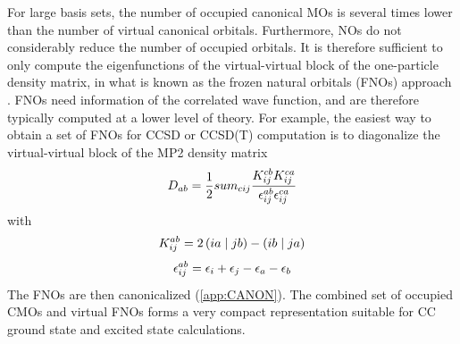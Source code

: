For large basis sets, the number of occupied canonical MOs is several times lower than the number of virtual canonical orbitals. Furthermore, NOs do not considerably reduce the number of occupied orbitals. It is therefore sufficient to only compute the eigenfunctions of the virtual-virtual block of the one-particle density matrix, in what is known as the frozen natural orbitals (FNOs) approach \cite{Bar1970}. FNOs need information of the correlated wave function, and are therefore typically computed at a lower level of theory. For example, the easiest way to obtain a set of FNOs for CCSD or CCSD(T) computation is to diagonalize the virtual-virtual block  of the MP2 density matrix \cite{Sos1989, Tau2005, Tau2008}
\begin{equation}
D_{ab} = \frac{1}{2} sum_{cij} \frac{K_{ij}^{cb} K_{ij}^{ca}}{\epsilon_{ij}^{ab} \epsilon_{ij}^{ca}}
\end{equation}
\noindent with
\begin{equation}
K_{ij}^{ab} = 2 \left( ia \mid jb \right) - \left( ib \mid ja \right)
\end{equation}
\begin{equation}
\epsilon_{ij}^{ab} = \epsilon_i + \epsilon_j - \epsilon_a - \epsilon_b 
\end{equation}
The FNOs are then canonicalized (\ref{app:CANON}). The combined set of occupied CMOs and virtual FNOs forms a very compact representation suitable for CC ground state and excited state calculations.





